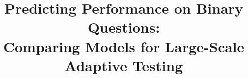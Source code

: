\documentclass{sig-alternate}
\begin{document}
%

\title{Predicting Performance on Binary Questions:\\Comparing Models for Large-Scale Adaptive Testing}
%
%
%
%
%
\end{document}
